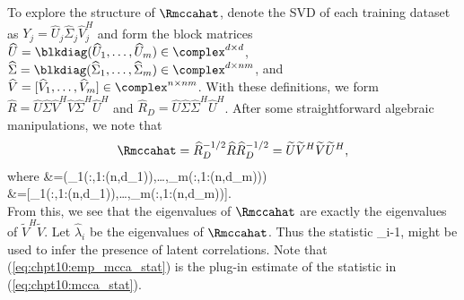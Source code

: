 To explore the structure of $\Rmccahat$, denote the SVD of each training dataset as
$Y_j=\widehat{U}_j\widehat{\Sigma}_j\widehat{V}_j^H$ and form the block matrices
$\widehat{U}=\blkdiag(\widehat{U}_1,\dots,\widehat{U}_m)\in\complex^{d\times d}$,
$\widehat{\Sigma}=\blkdiag(\widehat{\Sigma}_1,\dots,\widehat{\Sigma}_m)\in\complex^{d\times nm}$, and
$\widehat{V}=[\widehat{V}_1,\dots,\widehat{V}_m]\in\complex^{n\times nm}$. With these definitions, we form
$\widehat{R}=\widehat{U}\widehat{\Sigma} \widehat{V}^H\widehat{V}\widehat{\Sigma}^H\widehat{U}^H$ and $\widehat{R}_D=\widehat{U}\widehat{\Sigma}\widehat{\Sigma}^H\widehat{U}^H$. After some straightforward
algebraic manipulations, we note that
\begin{equation}\label{eq:chpt10:rmccahat}
\begin{aligned}
&\Rmccahat=\widehat{R}_D^{-1/2}\widehat{R}\widehat{R}_D^{-1/2}=\widetilde{U}\widetilde{V}^H\widetilde{V}\widetilde{U}^H,\\
\end{aligned}
\end{equation}
where 
{\small{
\be\ba
&{\small{=\blkdiag(_1(:,1:\min(n,d_1)),\dots,_m(:,1:\min(n,d_m)))}}\\
&=[_1(:,1:\min(n,d_1)),\dots,_m(:,1:\min(n,d_m))].\\
\ea\ee
}}
From this, we see that the eigenvalues of $\Rmccahat$ are exactly the eigenvalues of
$\widetilde{V}^H\widetilde{V}$. Let $\widehat{\lambda}_i$ be the eigenvalues of
$\Rmccahat$. Thus the statistic
\beq\label{eq:chpt10:emp_mcca_stat}
\widehat{\lambda}_i-1,
\eeq
might be used to infer the presence of latent correlations. Note that (\ref{eq:chpt10:emp_mcca_stat}) is the plug-in estimate of the statistic in (\ref{eq:chpt10:mcca_stat}).

